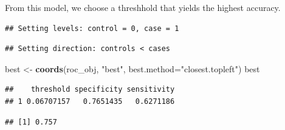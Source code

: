 \documentclass[
]{article}
\newenvironment{Shaded}{\begin{snugshade}}{\end{snugshade}}
\newcommand{\AttributeTok}[1]{\textcolor[rgb]{0.13,0.29,0.53}{#1}}
\newcommand{\CommentTok}[1]{\textcolor[rgb]{0.56,0.35,0.01}{\textit{#1}}}
\newcommand{\DecValTok}[1]{\textcolor[rgb]{0.00,0.00,0.81}{#1}}
\newcommand{\FunctionTok}[1]{\textcolor[rgb]{0.13,0.29,0.53}{\textbf{#1}}}
\newcommand{\NormalTok}[1]{#1}
\newcommand{\OtherTok}[1]{\textcolor[rgb]{0.56,0.35,0.01}{#1}}
\newcommand{\SpecialCharTok}[1]{\textcolor[rgb]{0.81,0.36,0.00}{\textbf{#1}}}
\newcommand{\StringTok}[1]{\textcolor[rgb]{0.31,0.60,0.02}{#1}}
\begin{document}
From this model, we choose a threshhold that yields the highest
accuracy.

\begin{Shaded}
\end{Shaded}

\begin{verbatim}
## Setting levels: control = 0, case = 1
\end{verbatim}

\begin{verbatim}
## Setting direction: controls < cases
\end{verbatim}

\begin{Shaded}
\begin{Highlighting}[]
\NormalTok{best }\OtherTok{\textless{}{-}} \FunctionTok{coords}\NormalTok{(roc\_obj, }\StringTok{"best"}\NormalTok{, }\AttributeTok{best.method=}\StringTok{"closest.topleft"}\NormalTok{)}
\NormalTok{best}
\end{Highlighting}
\end{Shaded}

\begin{verbatim}
##    threshold specificity sensitivity
## 1 0.06707157   0.7651435   0.6271186
\end{verbatim}

\begin{Shaded}
\end{Shaded}

\begin{verbatim}
## [1] 0.757
\end{verbatim}
\end{document}
